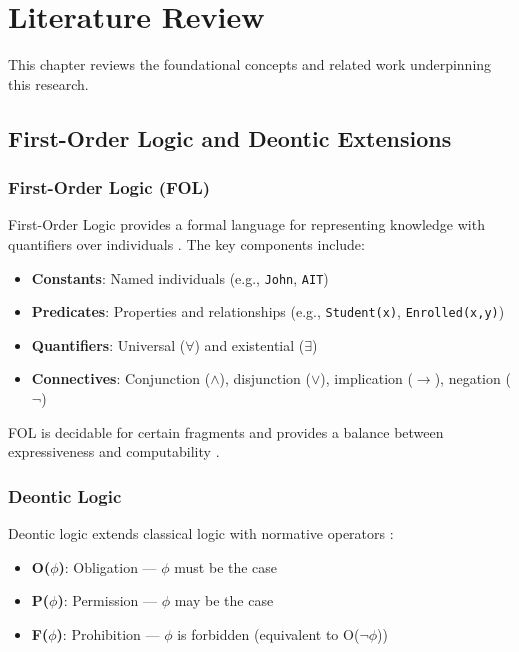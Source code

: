 \chapter{Literature Review}
\label{ch:literature}

This chapter reviews the foundational concepts and related work underpinning this research.

\section{First-Order Logic and Deontic Extensions}

\subsection{First-Order Logic (FOL)}

First-Order Logic provides a formal language for representing knowledge with quantifiers over individuals \cite{brachman2004knowledge}. The key components include:

\begin{itemize}
    \item \textbf{Constants}: Named individuals (e.g., \texttt{John}, \texttt{AIT})
    \item \textbf{Predicates}: Properties and relationships (e.g., \texttt{Student(x)}, \texttt{Enrolled(x,y)})
    \item \textbf{Quantifiers}: Universal ($\forall$) and existential ($\exists$)
    \item \textbf{Connectives}: Conjunction ($\wedge$), disjunction ($\vee$), implication ($\rightarrow$), negation ($\neg$)
\end{itemize}

FOL is decidable for certain fragments and provides a balance between expressiveness and computability \cite{russell2016artificial}.

\subsection{Deontic Logic}

Deontic logic extends classical logic with normative operators \cite{governatori2010defeasible}:

\begin{itemize}
    \item \textbf{O($\phi$)}: Obligation --- $\phi$ must be the case
    \item \textbf{P($\phi$)}: Permission --- $\phi$ may be the case
    \item \textbf{F($\phi$)}: Prohibition --- $\phi$ is forbidden (equivalent to O($\neg\phi$))
\end{itemize}

